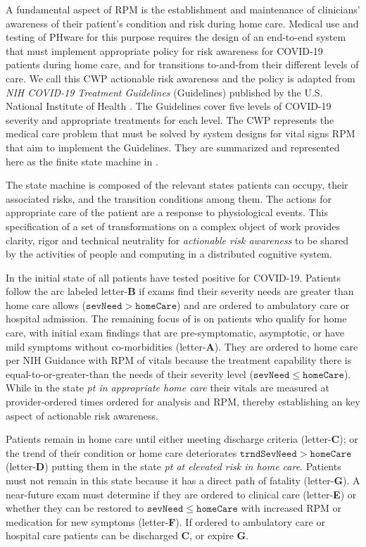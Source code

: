 A fundamental aspect of RPM is the establishment and maintenance of clinicians' awareness of their patient’s condition and risk during home care.
Medical use and testing of PHware for this purpose requires the design of an end-to-end system that must implement appropriate policy for risk awareness for COVID-19 patients during home care, and for transitions to-and-from their different levels of care.
We call this CWP actionable risk awareness and the policy is adapted from \emph{NIH COVID-19 Treatment Guidelines} (Guidelines) published by the U.S. National Institute of Health \cite{NIH}.
The Guidelines cover five levels of COVID-19 severity and appropriate treatments for each level.
The CWP represents the medical care problem that must be solved by system designs for vital signs RPM that aim to implement the Guidelines.
They are summarized and represented here as the finite state machine in .

The state machine is composed of the relevant states patients can occupy, their associated risks, and the transition conditions among them. The actions for appropriate care of the patient are a response to physiological events. This specification of a set of transformations on a complex object of work provides clarity, rigor and technical neutrality for \emph{actionable risk awareness} to be shared by the activities of people and computing in a distributed cognitive system.

In the initial state of  all patients have tested positive for COVID-19. Patients follow the arc labeled letter-\textbf{B} if exams find their severity needs are greater than home care allows ($\mathtt{sevNeed} > \mathtt{homeCare}$) and are ordered to ambulatory care or hospital admission.
The remaining focus of  is on patients who qualify for home care, with initial exam findings that are pre-symptomatic, asymptotic, or have mild symptoms without co-morbidities (letter-\textbf{A}).
They are ordered to home care per NIH Guidance with RPM of vitals because the treatment capability there is equal-to-or-greater-than the needs of their severity level ($\mathtt{sevNeed} \le \mathtt{homeCare}$).
While in the state \emph{pt in appropriate home care} their vitals are measured at provider-ordered times ordered for analysis and RPM, thereby establishing an key aspect of actionable risk awareness.

Patients remain in home care until either meeting discharge criteria (letter-\textbf{C}); or the trend of their condition or home care deteriorates $\mathtt{trndSevNeed} > \mathtt{homeCare}$ (letter-\textbf{D}) putting them in the state \emph{pt at elevated risk in home care}.
Patients must not remain in this state because it has a direct path of fatality (letter-\textbf{G}).
A near-future exam must determine if they are ordered to clinical care (letter-\textbf{E}) or whether they can be restored to $\mathtt{sevNeed} \le \mathtt{homeCare}$ with increased RPM or medication for new symptoms (letter-\textbf{F}).
If ordered to ambulatory care or hospital care patients can be discharged \textbf{C}, or expire \textbf{G}.

